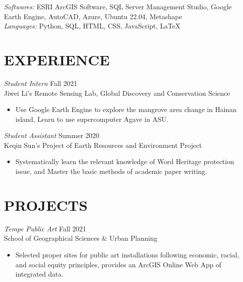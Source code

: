 \documentclass[margin,10pt]{res} %
\begin{document}
\begin{resume}
{\sl Softwares:} 
ESRI ArcGIS Software, SQL Server Management Studio, Google Earth Engine, AutoCAD, Azure, Ubuntu 22.04, Metashape \vspace{1.5mm}\\
{\sl Languages:}
Python, SQL, HTML, CSS, JavaScript, LaTeX \\
 
\section{EXPERIENCE}

{\sl Student Intern} \hfill Fall 2021 \\
Jiwei Li's Remote Sensing Lab, Global Discovery and Conservation Science

\begin{itemize} \itemsep -2pt %
\item Use Google Earth Engine to explore the mangrove area change in Hainan island, Learn to use supercomputer Agave in ASU.
\end{itemize}
{\sl Student Assistant} \hfill Summer 2020 \\
Keqin Sun's Project of Earth Resources and Environment Project
\begin{itemize} 
\item Systematically learn the relevant knowledge of Word Heritage protection issue, and Master the basic methods of academic paper writing.
\end{itemize} 


\section{PROJECTS}
{\sl Tempe Public Art} \hfill Fall 2021 \\
School of Geographical Sciences \& Urban Planning
\begin{itemize}
    \item Selected proper sites for public art installations following economic, racial, and social equity principles, provides an ArcGIS Online Web App of integrated data.
\end{itemize}


\end{resume}
\end{document}
